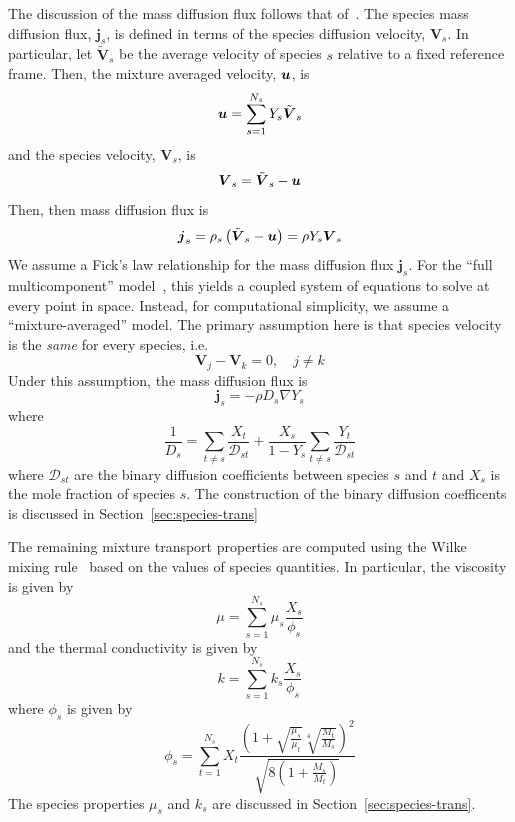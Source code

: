 The discussion of the mass diffusion flux follows that of~\cite{Kee}.
The species mass diffusion flux, $\boldsymbol{j}_s$, is defined in terms
of the species diffusion velocity, $\boldsymbol{V}_s$. In particular,
let $\tilde{\boldsymbol{V}}_s$ be the average velocity of species $s$
relative to a fixed reference frame. Then, the mixture averaged
velocity, $\boldsymbol{u}$, is
%
\begin{equation}
  \boldsymbol{u} = \sum_{s=1}^{N_s} Y_s \tilde{\boldsymbol{V}}_s
\end{equation}
%
and the species velocity, $\boldsymbol{V}_s$, is
%
\begin{equation}
  \boldsymbol{V}_s = \tilde{\boldsymbol{V}}_s - \boldsymbol{u}
\end{equation}
%
Then, then mass diffusion flux is
%
\begin{equation}
  \boldsymbol{j}_s = \rho_s \left( \tilde{\boldsymbol{V}}_s - \boldsymbol{u}
  \right) = \rho Y_s \boldsymbol{V}_s
\end{equation}
%
We assume a Fick's law relationship for the mass diffusion flux
$\boldsymbol{j}_s$. For the ``full multicomponent'' model~\cite{Kuo}, this yields
a coupled system of equations to solve at every point in
space. Instead, for computational simplicity, we assume a
``mixture-averaged'' model. The primary assumption here is that
species velocity is the \emph{same} for every species, i.e.
%
\begin{equation}
  \boldsymbol{V}_j - \boldsymbol{V}_k = 0, \quad j \ne k
\end{equation}
%
Under this assumption, the mass diffusion flux is
%
\begin{equation}
  \boldsymbol{j}_s = -\rho D_s \nabla Y_s
\end{equation}
%
where
%
\begin{equation}
  \frac{1}{D_s} = \sum_{t\ne s} \frac{X_t}{\mathcal{D}_{st}} +
  \frac{X_s}{1-Y_s} \sum_{t\ne s} \frac{Y_t}{\mathcal{D}_{st}}
\end{equation}
%
where $\mathcal{D}_{st}$ are the binary diffusion coefficients between
species $s$ and $t$ and $X_s$ is the mole fraction of species $s$. The
construction of the binary diffusion coefficents is discussed in
Section~\ref{sec:species-trans}


The remaining mixture transport properties are computed using the
Wilke mixing rule~\cite{Wilke} based on the values of species
quantities. In particular, the viscosity is given by
%
\begin{equation}
\mu = \sum_{s=1}^{N_s} \mu_s \frac{X_s}{\phi_s}
\end{equation}
%
and the thermal conductivity is given by
%
\begin{equation}
k = \sum_{s=1}^{N_s} k_s \frac{X_s}{\phi_s}
\end{equation}
%
where $\phi_s$ is given by
%
\begin{equation}
\phi_s = \sum_{t=1}^{N_s} X_t \frac{ \left(1 +
  \sqrt{\frac{\mu_s}{\mu_t}}\sqrt[4]{\frac{M_t}{M_s}}\right)^2}{\sqrt{8\left(
1+ \frac{M_s}{M_t}\right)}}
\end{equation}
%
The species properties $\mu_s$ and $k_s$ are discussed in
Section~\ref{sec:species-trans}.

